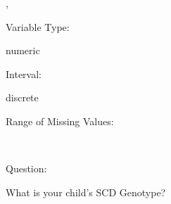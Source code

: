 \documentclass[
]{article}
\begin{document}
,

\begin{minipage}[t]{0.3\linewidth}

\colorbox{mypink1}{}

\end{minipage}%
\begin{minipage}[t]{0.7\linewidth}

\colorbox{mypink1}{\makebox[\textwidth]{\strut\bfseries\color{black}  
 }}

\end{minipage}

\begin{minipage}[t]{0.3\linewidth}

Variable Type:

\end{minipage}%
\begin{minipage}[t]{0.7\linewidth}

numeric

\end{minipage}

\begin{minipage}[t]{0.3\linewidth}

Interval:

\end{minipage}%
\begin{minipage}[t]{0.7\linewidth}

discrete

\end{minipage}

\begin{minipage}[t]{0.3\linewidth}

Range of Missing Values:

\end{minipage}%
\begin{minipage}[t]{0.7\linewidth}

~

\end{minipage}

\begin{minipage}[t]{0.3\linewidth}

Question:

\end{minipage}%
\begin{minipage}[t]{0.7\linewidth}

What is your child's SCD Genotype?

\end{minipage}
\end{document}
